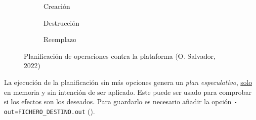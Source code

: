 \documentclass[11pt]{article}
\begin{document}
\begin{flushleft}
			\begin{figure}[htb]
				\begin{subfigure}{.49\textwidth}
					\centering
					\caption{Creación}
				\end{subfigure}
				\begin{subfigure}{.49\textwidth}
					\centering
					\caption{Destrucción}
				\end{subfigure}
				\linebreak
				
				\begin{subfigure}{.8\textwidth}
					\caption{Reemplazo}
				\end{subfigure}
				\caption{Planificación de operaciones contra la plataforma (O. Salvador, 2022)}
			\end{figure}

		La ejecución de la planificación sin más opciones genera un \textit{plan especulativo}, \underline{solo} en memoria y sin intención de ser aplicado. Este puede ser usado para comprobar si los efectos son los deseados. Para guardarlo es necesario añadir la opción \texttt{-out=FICHERO\_DESTINO.out} (\cite{hashicorp_plan}).
		\linebreak
		

\end{flushleft}
\end{document}
